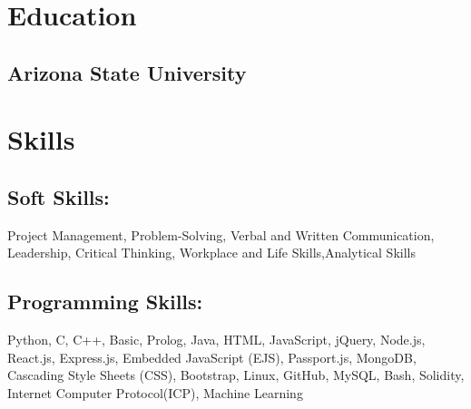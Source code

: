 \documentclass[a4paper]{deedy-resume} %
\begin{document}
\begin{minipage}[t]{0.33\textwidth} %


\section{Education} 



\subsection{Arizona State University}


\sectionspace %




\section{Skills}

\subsection{Soft Skills:}

Project Management, Problem-Solving, Verbal and Written Communication, Leadership, Critical Thinking, Workplace and Life Skills,Analytical Skills


\sectionspace %


\subsection{Programming Skills:}

Python, C, C++, Basic, Prolog, Java, HTML, JavaScript, jQuery, Node.js, React.js, Express.js, Embedded JavaScript (EJS),
Passport.js, MongoDB, Cascading Style Sheets (CSS), Bootstrap, Linux, GitHub, MySQL, Bash, Solidity, Internet Computer Protocol(ICP), Machine
Learning



\end{minipage}
\end{document}
